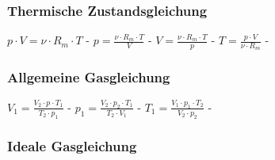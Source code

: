 \subsubsection{Thermische Zustandsgleichung} 
\begin{minipage}{0.45\textwidth} 
\end{minipage} 
\begin{minipage}{0.45\textwidth} 
 
\legende{}\end{minipage} 
 
$ p\cdot V =\nu \cdot R_{m} \cdot T $ - $ p =\frac{\nu \cdot R_{m} \cdot T}{  V} $ - $ V =\frac{\nu \cdot R_{m} \cdot T}{  p} $ - $ T =\frac{p\cdot V}{\nu \cdot R_{m} } $ - \\ 
 
\subsubsection{Allgemeine Gasgleichung} 
\begin{minipage}{0.45\textwidth} 
\end{minipage} 
\begin{minipage}{0.45\textwidth} 
 
\legende{}\end{minipage} 
 
$ V_{1}  = \frac{V_{2} \cdot p_{} \cdot T_{1} }{  T_{2} \cdot p_{1} } $ - $ p_{1}  = \frac{V_{2} \cdot p_{2} \cdot T_{1} }{  T_{2} \cdot V_{1} } $ - $ T_{1}  = \frac{V_{1} \cdot p_{1} \cdot T_{2} }{  V_{2} \cdot p_{2} } $ - \\ 
 
\subsubsection{Ideale Gasgleichung}
\begin{minipage}{0.45\textwidth}

 \\
\end{minipage}
\begin{minipage}{0.45\textwidth}


\end{minipage} 

